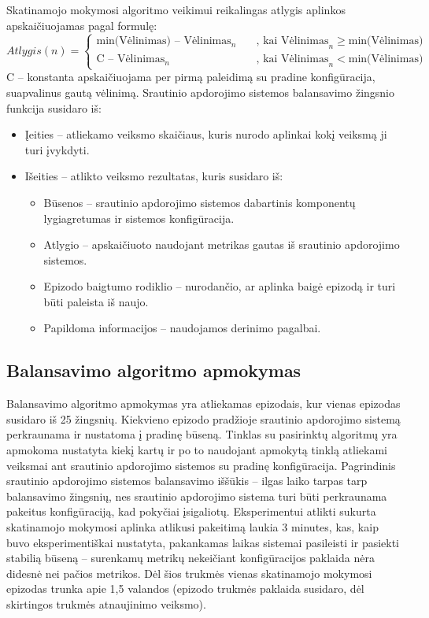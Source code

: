 \documentclass{VUMIFPSbakalaurinis}
\begin{document}
Skatinamojo mokymosi algoritmo veikimui reikalingas atlygis aplinkos apskaičiuojamas pagal formulę:
\[ Atlygis(n) =
\begin{cases}
    \text{min(Vėlinimas) } – \text{ Vėlinimas}_n  & \quad \text{, kai Vėlinimas}_n \geq \text{min(Vėlinimas)}\\
    \text{C } – \text{ Vėlinimas}_n  & \quad \text{, kai Vėlinimas}_n < \text{min(Vėlinimas)}
\end{cases}
\]
C – konstanta apskaičiuojama per pirmą paleidimą su pradine konfigūracija, suapvalinus gautą vėlinimą. \newline
Srautinio apdorojimo sistemos balansavimo žingsnio funkcija susidaro iš:
\begin{itemize}
 \item Įeities – atliekamo veiksmo skaičiaus, kuris nurodo aplinkai kokį veiksmą ji turi įvykdyti.
 \item Išeities – atlikto veiksmo rezultatas, kuris susidaro iš:
 \begin{itemize}
    \item Būsenos – srautinio apdorojimo sistemos dabartinis komponentų lygiagretumas ir sistemos konfigūracija.
    \item Atlygio – apskaičiuoto naudojant metrikas gautas iš srautinio apdorojimo sistemos.
    \item Epizodo baigtumo rodiklio – nurodančio, ar aplinka baigė epizodą ir turi būti paleista iš naujo.
    \item Papildoma informacijos – naudojamos derinimo pagalbai.
 \end{itemize}
\end{itemize}

\subsection{Balansavimo algoritmo apmokymas}

Balansavimo algoritmo apmokymas yra atliekamas epizodais, kur vienas epizodas susidaro iš 25 žingsnių. Kiekvieno epizodo pradžioje srautinio apdorojimo sistemą perkraunama ir nustatoma į pradinę būseną. Tinklas su pasirinktų algoritmų yra apmokoma nustatyta kiekį kartų ir po to naudojant apmokytą tinklą atliekami veiksmai ant srautinio apdorojimo sistemos su pradinę konfigūracija. Pagrindinis srautinio apdorojimo sistemos balansavimo iššūkis – ilgas laiko tarpas tarp balansavimo žingsnių, nes srautinio apdorojimo sistema turi būti perkraunama pakeitus konfigūraciją, kad pokyčiai įsigaliotų. Eksperimentui atlikti sukurta skatinamojo mokymosi aplinka atlikusi pakeitimą laukia 3 minutes, kas, kaip buvo eksperimentiškai nustatyta, pakankamas laikas sistemai pasileisti ir pasiekti stabilią būseną – surenkamų metrikų nekeičiant konfigūracijos paklaida nėra didesnė nei pačios metrikos. Dėl šios trukmės vienas skatinamojo mokymosi epizodas trunka apie 1,5 valandos (epizodo trukmės paklaida susidaro, dėl skirtingos trukmės atnaujinimo veiksmo). 
\end{document}
